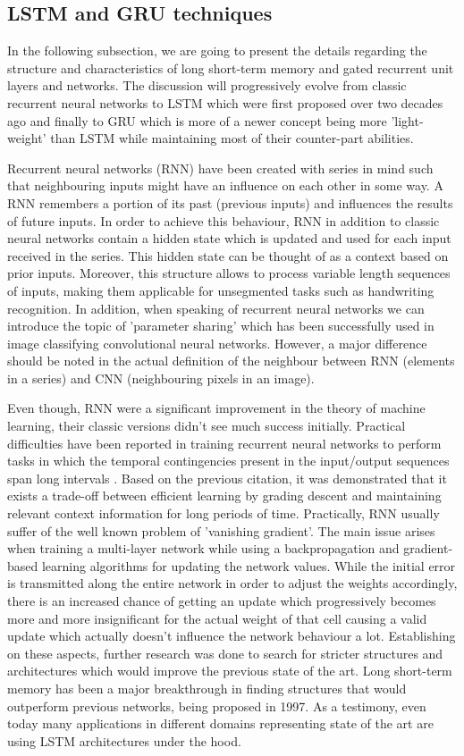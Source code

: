 \subsection{LSTM and GRU techniques}
In the following subsection, we are going to present the details regarding the structure and characteristics of long short-term memory and gated recurrent unit layers and networks. The discussion will progressively evolve from classic recurrent neural networks to LSTM which were first proposed over two decades ago and finally to GRU which is more of a newer concept being more 'light-weight' than LSTM while maintaining most of their counter-part abilities.

Recurrent neural networks (RNN) have been created with series in mind such that neighbouring inputs might have an influence on each other in some way. A RNN remembers a portion of its past (previous inputs) and influences the results of future inputs. In order to achieve this behaviour, RNN in addition to classic neural networks contain a hidden state which is updated and used for each input received in the series. This hidden state can be thought of as a context based on prior inputs. Moreover, this structure allows to process variable length sequences of inputs, making them applicable for unsegmented tasks such as handwriting recognition. In addition, when speaking of recurrent neural networks we can introduce the topic of 'parameter sharing' which has been successfully used in image classifying convolutional neural networks. However, a major difference should be noted in the actual definition of the neighbour between RNN (elements in a series) and CNN (neighbouring pixels in an image).

Even though, RNN were a significant improvement in the theory of machine learning, their classic versions didn't see much success initially. Practical difficulties have been reported in training recurrent neural networks to perform tasks in which the temporal contingencies present in the input/output sequences span long intervals \cite{bengio1994learning}. Based on the previous citation, it was demonstrated that it exists a trade-off between efficient learning by grading descent and maintaining relevant context information for long periods of time. Practically, RNN usually suffer of the well known problem of 'vanishing gradient'. The main issue arises when training a multi-layer network while using a backpropagation and gradient-based learning algorithms for updating the network values. While the initial error is transmitted along the entire network in order to adjust the weights accordingly, there is an increased chance of getting an update which progressively becomes more and more insignificant for the actual weight of that cell causing a valid update which actually doesn't influence the network behaviour a lot.  Establishing on these aspects, further research was done to search for stricter structures and architectures which would improve the previous state of the art. Long short-term memory has been a major breakthrough in finding structures that would outperform previous networks, being proposed in 1997. As a testimony, even today many applications in different domains representing state of the art are using LSTM architectures under the hood.

